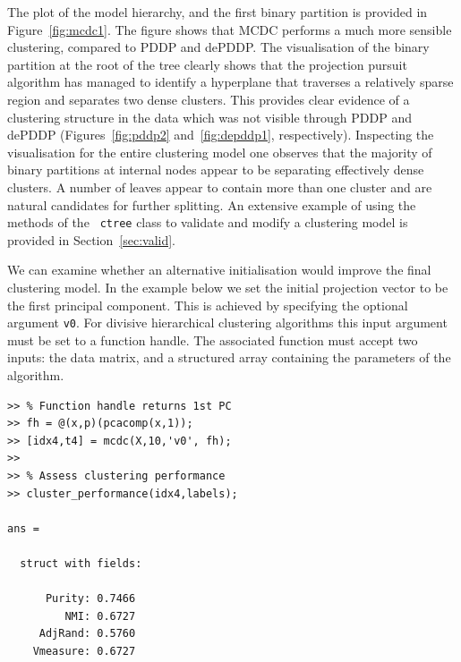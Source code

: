\documentclass{book}
\begin{document}
The plot of the model hierarchy, and the first binary partition is provided in
Figure~\ref{fig:mcdc1}.
%
The figure shows that MCDC performs a much more sensible clustering, compared
to PDDP and dePDDP. The visualisation of the binary partition at the root of
the tree clearly shows that the projection pursuit algorithm has managed to
identify a hyperplane that traverses a relatively sparse region and separates two
dense clusters. This provides clear evidence of a clustering structure in the
data which was not visible through PDDP and dePDDP (Figures~\ref{fig:pddp2}
and~\ref{fig:depddp1}, respectively).
%
Inspecting the visualisation for the entire clustering model one observes that
the majority of binary partitions at internal nodes appear to be separating
effectively dense clusters. 
%
A number of leaves appear to contain more than one cluster and are natural
candidates for further splitting. 
%
An extensive example of using the methods of the {\tt
ctree} class to validate and modify a clustering model is
provided in Section~\ref{sec:valid}.



We can examine whether an alternative initialisation would improve the final
clustering model. In the example below we set the initial projection vector to
be the first principal component. This is achieved by specifying the optional
argument {\tt v0}. For divisive hierarchical clustering algorithms this input
argument must be set to a function handle. The associated function must accept
two inputs: the data matrix, and a structured array containing the parameters
of the algorithm.


\begin{lstlisting}
>> % Function handle returns 1st PC
>> fh = @(x,p)(pcacomp(x,1));
>> [idx4,t4] = mcdc(X,10,'v0', fh);
>> 
>> % Assess clustering performance
>> cluster_performance(idx4,labels);

ans = 

  struct with fields:

      Purity: 0.7466
         NMI: 0.6727
     AdjRand: 0.5760
    Vmeasure: 0.6727

\end{lstlisting}
\end{document}
